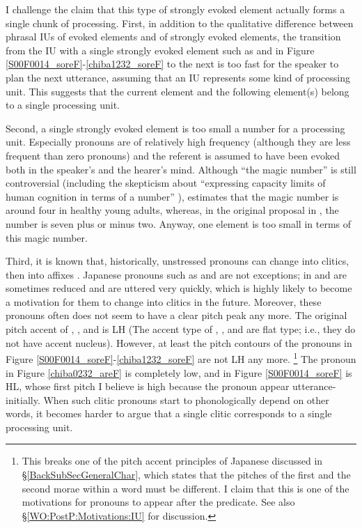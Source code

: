 I challenge the claim that this type of strongly evoked element actually forms a single chunk of processing.
First,
in addition to the qualitative difference between phrasal IUs of evoked elements and of strongly evoked elements,
the transition from the IU with a single strongly evoked element such as  and  in Figure \ref{S00F0014_soreF}-\ref{chiba1232_soreF} to the next is too fast for the speaker to plan the next utterance,
assuming that an IU represents some kind of processing unit.
This suggests that the current element and the following element(s) belong to a single processing unit.

Second, a single strongly evoked element is too small a number for a processing unit.
Especially pronouns are of relatively high frequency (although they are less frequent than zero pronouns) and the referent is assumed to have been evoked both in the speaker's and the hearer's mind.
Although ``the magic number'' is still controversial (including the skepticism about ``expressing capacity limits of human cognition in terms of a number'' \cite[][p.~245]{oberauer07}),
 estimates that the magic number is around four in healthy young adults,
whereas, in the original proposal in ,
the number is seven plus or minus two.
Anyway, one element is too small in terms of this magic number.



Third,
it is known that, historically, unstressed pronouns can change into clitics, then into affixes \cite{givon76}.
Japanese pronouns such as  and  are not exceptions;
 in  and  are sometimes reduced and are uttered very quickly,
which is highly likely to become a motivation for them to change into clitics in the future.
Moreover, these pronouns often does not seem to have a clear pitch peak any more.
The original pitch accent of , , and  is LH
(The accent type of , , and  are flat type;
i.e., they do not have accent nucleus).
However, at least the pitch contours of the pronouns in Figure \ref{S00F0014_soreF}-\ref{chiba1232_soreF} are not LH any more.%
	\footnote{
	This breaks one of the pitch accent principles of Japanese discussed in \S \ref{BackSubSecGeneralChar},
	which states that the pitches of the first and the second morae within a word must be different.
	I claim that this is one of the motivations for pronouns to appear after the predicate.
	See also \S \ref{WO:PostP:Motivations:IU} for discussion.
	}
The pronoun  in Figure \ref{chiba0232_areF} is completely low,
and  in Figure \ref{S00F0014_soreF} is HL, whose first pitch I believe is high because the pronoun appear utterance-initially.
When such clitic pronouns start to phonologically depend on other words,
it becomes harder to argue that a single clitic corresponds to a single processing unit.

